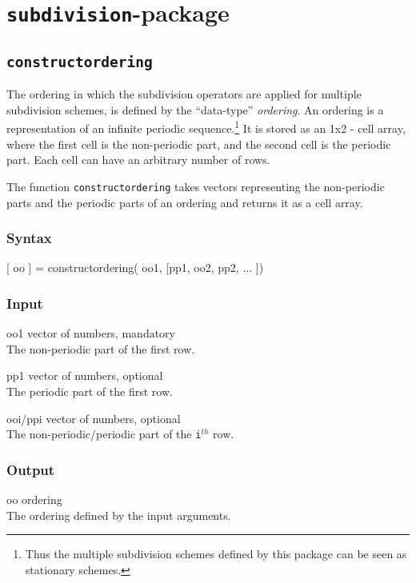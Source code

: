 

\chapter{\texttt{subdivision}-package}

\section{\texttt{constructordering}}\label{constructordering}
The ordering in which the subdivision operators are applied for multiple subdivision schemes, is defined by the ``data-type'' \emph{ordering}. 
An ordering is a representation of an infinite periodic sequence.\footnote{Thus the multiple subdivision schemes defined by this package can be seen as stationary schemes.}
It is stored as an 1x2 - cell array, where the first cell is the non-periodic part, and the second cell is the periodic part.
Each cell can have an arbitrary number of rows.

The function \texttt{constructordering} takes vectors representing the non-periodic parts and the periodic parts of an ordering and returns it as a cell array.

\subsection*{Syntax}
\begin{param}
\item[{[ oo ] = constructordering( oo1, [pp1, oo2, pp2, ... ])}]
\end{param}

\subsection*{Input}
\begin{param}
    \item[oo1] vector of numbers, mandatory\\ The non-periodic part of the first row.
    \item[pp1] vector of numbers, optional\\ The periodic part of the first row.
    \item[ooi/ppi] vector of numbers, optional\\ The non-periodic/periodic part of the \texttt{i}$^{th}$ row.  
\end{param}

\subsection*{Output}
\begin{param}
    \item[oo] ordering\\The ordering defined by the input arguments. 
\end{param}

